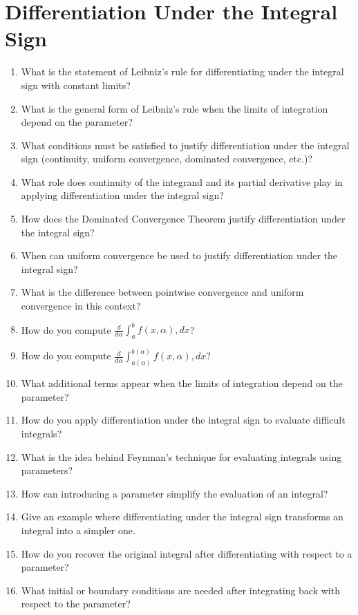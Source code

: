 \section{Differentiation Under the Integral Sign}

\begin{enumerate}
  \item What is the statement of Leibniz's rule for differentiating under the integral sign with constant limits?
  \item What is the general form of Leibniz's rule when the limits of integration depend on the parameter?
  \item What conditions must be satisfied to justify differentiation under the integral sign (continuity, uniform convergence, dominated convergence, etc.)?
  \item What role does continuity of the integrand and its partial derivative play in applying differentiation under the integral sign?
  \item How does the Dominated Convergence Theorem justify differentiation under the integral sign?
  \item When can uniform convergence be used to justify differentiation under the integral sign?
  \item What is the difference between pointwise convergence and uniform convergence in this context?
  \item How do you compute \(\frac{d}{d\alpha}\int_{a}^{b} f(x,\alpha),dx\)?
  \item How do you compute \(\frac{d}{d\alpha}\int_{a(\alpha)}^{b(\alpha)}f(x,\alpha),dx\)?
  \item What additional terms appear when the limits of integration depend on the parameter?
  \item How do you apply differentiation under the integral sign to evaluate difficult integrals?
  \item What is the idea behind Feynman's technique for evaluating integrals using parameters?
  \item How can introducing a parameter simplify the evaluation of an integral?
  \item Give an example where differentiating under the integral sign transforms an integral into a simpler one.
  \item How do you recover the original integral after differentiating with respect to a parameter?
  \item What initial or boundary conditions are needed after integrating back with respect to the parameter?

\end{enumerate}
